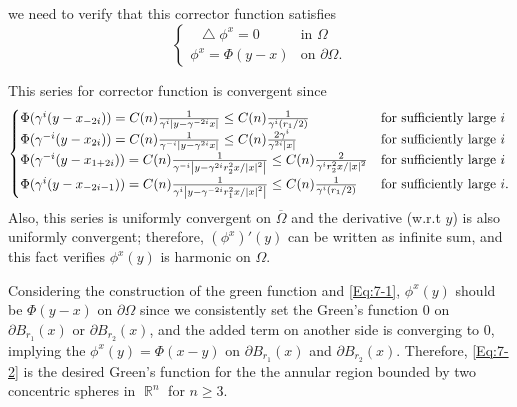 \documentclass{article}
\DeclareMathOperator{\rr}{\mathbb{R}}
\newcommand*\Laplace{\mathop{}\!\mathbin\bigtriangleup}
\begin{document}
we need to verify that this corrector function satisfies
\begin{equation*}
\begin{cases}
\Laplace \phi^x=0 & \text{in }\Omega \\
\phi^x=\Phi(y-x) & \text{on }\partial \Omega.
\end{cases}
\end{equation*}

This series for corrector function is convergent since
\begin{equation*}\label{Eq:7-1}
\begin{cases}
\Phi(\gamma^i(y-x_{-2i}))=C(n)\frac{1}{\gamma^i\abs{y-\gamma^{-2i}x}}\leq C(n)\frac{1}{\gamma^i (r_1/2)} & \text{for sufficiently large } i \\
\Phi(\gamma^{-i}(y-x_{2i}))=C(n)\frac{1}{\gamma^{-i}\abs{y-\gamma^{2i}x}}\leq C(n)\frac{2\gamma^i}{\gamma^{2i}\abs{x}} & \text{for sufficiently large } i \\
\Phi(\gamma^{-i}(y-x_{1+2i}))=C(n)\frac{1}{\gamma^{-i}\abs{y-\gamma^{2i}r_2^2 x/\abs{x}^2}}\leq C(n)\frac{2}{\gamma^i r_2^2 x/\abs{x}^2} & \text{for sufficiently large } i \\
\Phi(\gamma^i(y-x_{-2i-1}))=C(n)\frac{1}{\gamma^i\abs{y-\gamma^{-2i}r_1^2 x/\abs{x}^2}}\leq C(n)\frac{1}{\gamma^i (r_1/2)} & \text{for sufficiently large } i. \\
\end{cases}
\end{equation*}
Also, this series is uniformly convergent on $\overline{\Omega}$ and the derivative (w.r.t $y$) is also uniformly convergent; therefore, $\left(\phi^x\right)'(y)$ can be written as infinite sum, and this fact verifies $\phi^x(y)$ is harmonic on $\Omega$.

Considering the construction of the green function and \eqref{Eq:7-1}, $\phi^x(y)$ should be $\Phi(y-x)$ on $\partial \Omega$ since we consistently set the Green's function $0$ on $\partial B_{r_1}(x)$ or $\partial B_{r_2}(x)$, and the added term on another side is converging to $0$, implying the $\phi^x(y)=\Phi(x-y)$ on $\partial B_{r_1}(x)$ and $\partial B_{r_2}(x)$. Therefore, \eqref{Eq:7-2} is the desired Green's function for the the annular region bounded by two concentric spheres in $\rr^n$ for $n \geq 3$.
\end{document}
